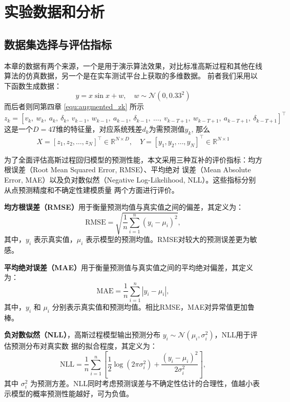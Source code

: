 \section{实验数据和分析}

\subsection{数据集选择与评估指标}

本章的数据有两个来源，一个是用于演示算法效果，对比标准高斯过程和其他在线算法的仿真数据，另一个是在实车测试平台上获取的多维数据。
前者我们采用以下函数生成数据：
\begin{equation}
    y = x \sin x + w, \quad w \sim \mathcal N(0, 0.33^2)
\end{equation}
而后者则同第四章 \autoref{equ:augmented_zk} 所示
\begin{equation}
    z_k = [v_k,\ w_k,\ a_k,\ \delta_k,\ v_{k-1},\ w_{k-1},\ a_{k-1},\ \delta_{k-1},\ \ldots,\ 
    v_{k-T+1},\ w_{k-T+1},\ a_{k-T+1},\ \delta_{k-T+1}]^\top
\end{equation}
这是一个$D=4T$维的特征量，对应系统残差$d_k$为需预测值$y_k$, 那么
\begin{equation}
X = [z_1, z_2, \ldots, z_N]^\top \in \mathbb R^{N \times D}, 
\quad Y = [y_1, y_2, \ldots, y_N]^\top \in \mathbb R^{N \times 1}
\end{equation}

为了全面评估高斯过程回归模型的预测性能，本文采用三种互补的评价指标：均方根误差（Root Mean Squared Error, RMSE）、平均绝对
误差（Mean Absolute Error, MAE）以及负对数似然（Negative Log-Likelihood, NLL）。这些指标分别从点预测精度和不确定性建模质量
两个方面进行评价。

\textbf{均方根误差（RMSE）}用于衡量预测均值与真实值之间的偏差，其定义为：
\begin{equation}
\mathrm{RMSE} = \sqrt{ \frac{1}{n} \sum_{i=1}^{n} (y_i - \mu_i)^2 },
\end{equation}
其中，$y_i$ 表示真实值，$\mu_i$ 表示模型的预测均值。RMSE对较大的预测误差更为敏感。

\textbf{平均绝对误差（MAE）}用于衡量预测值与真实值之间的平均绝对偏差，其定义为：
\begin{equation}
\mathrm{MAE} = \frac{1}{n} \sum_{i=1}^{n} |y_i - \mu_i|,
\end{equation}
其中，$y_i$ 和 $\mu_i$ 分别表示真实值和预测均值。相比RMSE，MAE对异常值更加鲁棒。

\textbf{负对数似然（NLL）}，高斯过程模型输出预测分布 $y_i \sim \mathcal{N}(\mu_i, \sigma_i^2)$，NLL用于评估预测分布对真实数
据的拟合程度，其定义为：
\begin{equation}
\mathrm{NLL} = \frac{1}{n} \sum_{i=1}^{n} \left[ 
\frac{1}{2} \log (2\pi \sigma_i^2) + \frac{(y_i - \mu_i)^2}{2\sigma_i^2}
\right],
\end{equation}
其中 $\sigma_i^2$ 为预测方差。NLL同时考虑预测误差与不确定性估计的合理性，值越小表示模型的概率预测性能越好，可为负值。

